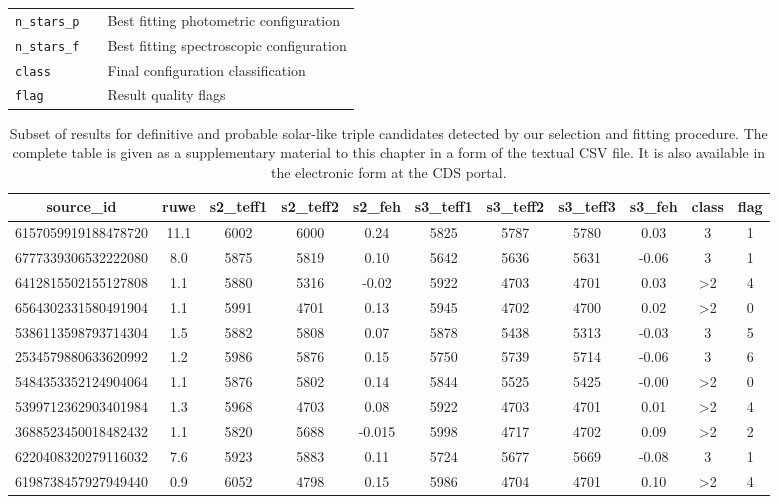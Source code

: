\begin{table}
\begin{tabular}{l c l}
		\texttt{n\_stars\_p} & & Best fitting photometric configuration \\
		\texttt{n\_stars\_f} & & Best fitting spectroscopic configuration\\
		
		\texttt{class} & & Final configuration classification \\
		\texttt{flag} & & Result quality flags \\
		\hline
	\end{tabular}
\end{table}

\begin{table}
	\centering
	\caption{Subset of results for definitive and probable solar-like triple candidates detected by our selection and fitting procedure. The complete table is given as a supplementary material to this chapter in a form of the textual CSV file. It is also available in the electronic form at the CDS portal.}
	\label{tab:out_triple}
	\begin{tabular}{ccccccccccc}
		\hline
		source\_id & ruwe & s2\_teff1 & s2\_teff2 & s2\_feh & s3\_teff1 & s3\_teff2 & s3\_teff3 & s3\_feh & class & flag \\
		\hline
		6157059919188478720 & 11.1 & 6002 & 6000 & 0.24 & 5825 & 5787 & 5780 & 0.03 & 3 & 1 \\
		6777339306532222080 & 8.0 & 5875 & 5819 & 0.10 & 5642 & 5636 & 5631 & -0.06 & 3 & 1 \\
		6412815502155127808 & 1.1 & 5880 & 5316 & -0.02 & 5922 & 4703 & 4701 & 0.03 & >2 & 4 \\
		6564302331580491904 & 1.1 & 5991 & 4701 & 0.13 & 5945 & 4702 & 4700 & 0.02 & >2 & 0 \\
		5386113598793714304 & 1.5 & 5882 & 5808 & 0.07 & 5878 & 5438 & 5313 & -0.03 & 3 & 5 \\
		2534579880633620992 & 1.2 & 5986 & 5876 & 0.15 & 5750 & 5739 & 5714 & -0.06 & 3 & 6 \\
		5484353352124904064 & 1.1 & 5876 & 5802 & 0.14 & 5844 & 5525 & 5425 & -0.00 & >2 & 0 \\
		5399712362903401984 & 1.3 & 5968 & 4703 & 0.08 & 5922 & 4703 & 4701 & 0.01 & >2 & 4 \\
		3688523450018482432 & 1.1 & 5820 & 5688 & -0.015 & 5998 & 4717 & 4702 & 0.09 & >2 & 2 \\
		6220408320279116032 & 7.6 & 5923 & 5883 & 0.11 & 5724 & 5677 & 5669 & -0.08 & 3 & 1 \\
		6198738457927949440 & 0.9 & 6052 & 4798 & 0.15 & 5986 & 4704 & 4701 & 0.10 & >2 & 4 \\

\end{tabular}
\end{table}
